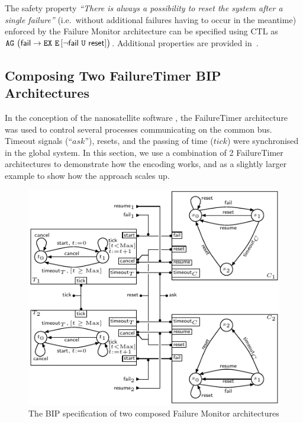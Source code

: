 \documentclass[smallcondensed]{svjour3}
\newcommand{\TODO}[1]{\textcolor{red}{\textbf{[TODO:#1]}}}
\newcommand{\AG}[1][\ ]{\ensuremath{\mathtt{AG}#1}}
\newcommand{\EX}[1][\ ]{\ensuremath{\mathtt{EX}#1}}
\newcommand{\EU}[3][\ ]{\ensuremath{\mathtt{E}\left[#2\ \mathtt{U}\ #3\right]#1}}
\newcommand{\ie}[1][\ ]{i.e.#1}
\begin{document}
The safety
property \emph{``There is always a possibility to reset the system
  after a single failure''} (\ie without
  additional failures having to occur in the meantime) enforced by the
  Failure Monitor architecture can be specified using CTL as
    $\AG
\bigl(\PortFail \rightarrow \EX \EU[]{\lnot \PortFail}{
  \PortReset}\bigr)$.  Additional properties are provided in~\cite{Avocs-RR}.



\subsection{Composing Two FailureTimer BIP Architectures}
\label{section:use-case:Double}

In the conception of the nanosatellite software \cite{CubETH-case-study}, the FailureTimer architecture was used to control several processes
communicating on the common bus. Timeout signals (``$ask$''), resets,
and the passing of time ($tick$) were synchronised in the global
system.
In this section, we use a combination of 2 FailureTimer architectures
to demonstrate how the encoding works, and as a slightly larger
example to show how the approach scales up.

\begin{figure}[ht]
  \centering
  \includegraphics[width=0.9\columnwidth]{ActaXFIG/BIPspec-DoubleArchFailureTimer-v2-2}
  \caption{The BIP specification of two composed Failure Monitor architectures}
  \label{schema:ArchFailure:BIP:Double}
\end{figure}
\end{document}
